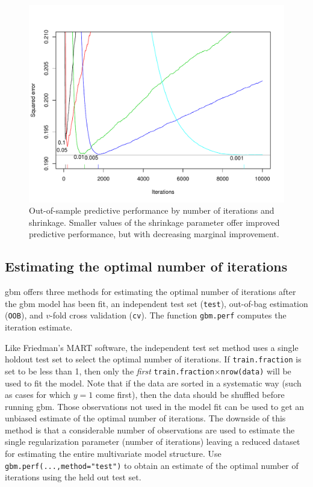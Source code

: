 \documentclass{article}
\begin{document}
\begin{figure}[ht] \begin{center} \includegraphics[width=5in]{shrinkage-v-iterations} \end{center} \caption{Out-of-sample predictive performance by number of iterations and shrinkage. Smaller values of the shrinkage parameter offer improved predictive performance, but with decreasing marginal improvement.} \label{fig:shrinkViters} \end{figure}

\subsection{Estimating the optimal number of iterations} gbm offers three methods for estimating the optimal number of iterations after the gbm model has been fit, an independent test set (\texttt{test}), out-of-bag estimation (\texttt{OOB}), and $v$-fold cross validation (\texttt{cv}). The function \texttt{gbm.perf} computes the iteration estimate.

Like Friedman's MART software, the independent test set method uses a single holdout test set to select the optimal number of iterations. If \texttt{train.fraction} is set to be less than 1, then only the \textit{first} \texttt{train.fraction}$\times$\texttt{nrow(data)} will be used to fit the model. Note that if the data are sorted in a systematic way (such as cases for which $y=1$ come first), then the data should be shuffled before running gbm. Those observations not used in the model fit can be used to get an unbiased estimate of the optimal number of iterations. The downside of this method is that a considerable number of observations are used to estimate the single regularization parameter (number of iterations) leaving a reduced dataset for estimating the entire multivariate model structure. Use \texttt{gbm.perf(...,method="test")} to obtain an estimate of the optimal number of iterations using the held out test set.
\end{document}
